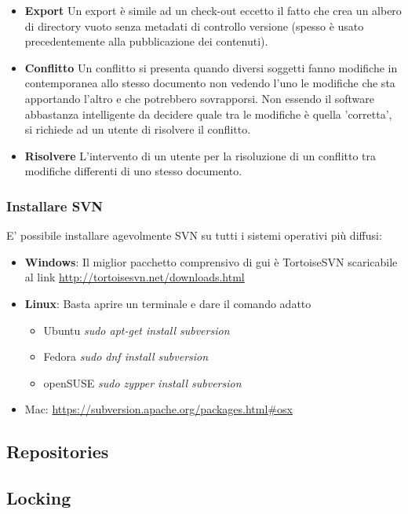 \begin{itemize}
\item \textbf{Export}
Un export è simile ad un check-out eccetto il fatto che crea un albero di directory vuoto senza metadati di controllo versione (spesso è usato precedentemente alla pubblicazione dei contenuti).

\item \textbf{Conflitto}
Un conflitto si presenta quando diversi soggetti fanno modifiche in contemporanea allo stesso documento non vedendo l'uno le modifiche che sta apportando l'altro e che potrebbero sovrapporsi. Non essendo il software abbastanza intelligente da decidere quale tra le modifiche è quella 'corretta', si richiede ad un utente di risolvere il conflitto.

\item \textbf{Risolvere}
L'intervento di un utente per la risoluzione di un conflitto tra modifiche differenti di uno stesso documento.
\end{itemize}

\subsubsection{Installare SVN}
E' possibile installare agevolmente SVN su tutti i sistemi operativi più diffusi:

\begin{itemize}
\item \textbf{Windows}: Il miglior pacchetto comprensivo di gui è TortoiseSVN scaricabile al link \url{http://tortoisesvn.net/downloads.html}
\item \textbf{Linux}: Basta aprire un terminale e dare il comando adatto 
\begin{itemize}
\item Ubuntu \textit{sudo apt-get install subversion} 
\item Fedora \textit{sudo dnf install subversion} 
\item openSUSE \textit{sudo zypper install subversion} 
\end{itemize}
\item Mac: \url{https://subversion.apache.org/packages.html#osx}
\end{itemize}

\subsection{Repositories}
\subsection{Locking}
